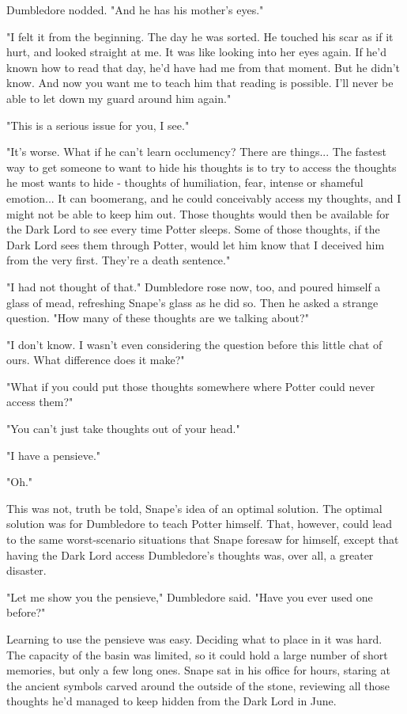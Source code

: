 Dumbledore nodded. "And he has his mother's eyes."

"I felt it from the beginning. The day he was sorted. He touched his scar as if it hurt, and looked straight at me. It was like looking into her eyes again. If he'd known how to read that day, he'd have had me from that moment. But he didn't know. And now you want me to teach him that reading is possible. I'll never be able to let down my guard around him again."

"This is a serious issue for you, I see."

"It's worse. What if he can't learn occlumency? There are things... The fastest way to get someone to want to hide his thoughts is to try to access the thoughts he most wants to hide - thoughts of humiliation, fear, intense or shameful emotion... It can boomerang, and he could conceivably access my thoughts, and I might not be able to keep him out. Those thoughts would then be available for the Dark Lord to see every time Potter sleeps. Some of those thoughts, if the Dark Lord sees them through Potter, would let him know that I deceived him from the very first. They're a death sentence."

"I had not thought of that." Dumbledore rose now, too, and poured himself a glass of mead, refreshing Snape's glass as he did so. Then he asked a strange question. "How many of these thoughts are we talking about?"

"I don't know. I wasn't even considering the question before this little chat of ours. What difference does it make?"

"What if you could put those thoughts somewhere where Potter could never access them?"

"You can't just take thoughts out of your head."

"I have a pensieve."

"Oh."

This was not, truth be told, Snape's idea of an optimal solution. The optimal solution was for Dumbledore to teach Potter himself. That, however, could lead to the same worst-scenario situations that Snape foresaw for himself, except that having the Dark Lord access Dumbledore's thoughts was, over all, a greater disaster.

"Let me show you the pensieve," Dumbledore said. "Have you ever used one before?"

Learning to use the pensieve was easy. Deciding what to place in it was hard. The capacity of the basin was limited, so it could hold a large number of short memories, but only a few long ones. Snape sat in his office for hours, staring at the ancient symbols carved around the outside of the stone, reviewing all those thoughts he'd managed to keep hidden from the Dark Lord in June.

